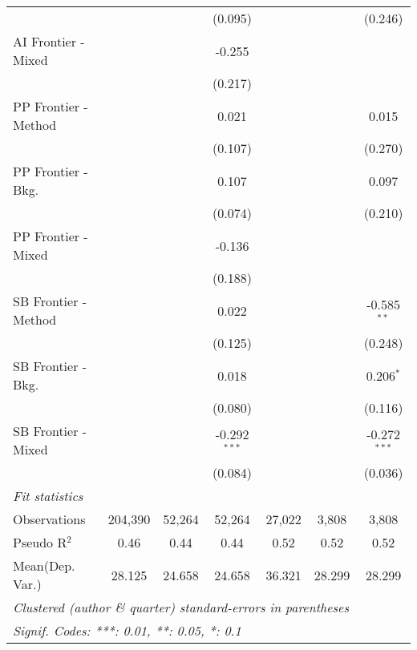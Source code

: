 \begin{tabular}{lcccccc}
                        &               &         & (0.095)        &             &         & (0.246)\\   
   AI Frontier - Mixed  &               &         & -0.255         &             &         &   \\   
                        &               &         & (0.217)        &             &         &   \\   
   PP Frontier - Method &               &         & 0.021          &             &         & 0.015\\   
                        &               &         & (0.107)        &             &         & (0.270)\\   
   PP Frontier - Bkg.   &               &         & 0.107          &             &         & 0.097\\   
                        &               &         & (0.074)        &             &         & (0.210)\\   
   PP Frontier - Mixed  &               &         & -0.136         &             &         &   \\   
                        &               &         & (0.188)        &             &         &   \\   
   SB Frontier - Method &               &         & 0.022          &             &         & -0.585$^{**}$\\   
                        &               &         & (0.125)        &             &         & (0.248)\\   
   SB Frontier - Bkg.   &               &         & 0.018          &             &         & 0.206$^{*}$\\   
                        &               &         & (0.080)        &             &         & (0.116)\\   
   SB Frontier - Mixed  &               &         & -0.292$^{***}$ &             &         & -0.272$^{***}$\\   
                        &               &         & (0.084)        &             &         & (0.036)\\   
   \midrule
   \emph{Fit statistics}\\
   Observations         & 204,390       & 52,264  & 52,264         & 27,022      & 3,808   & 3,808\\  
   Pseudo R$^2$         & 0.46          & 0.44    & 0.44           & 0.52        & 0.52    & 0.52\\  
Mean(Dep. Var.) & 28.125 & 24.658 & 24.658 & 36.321 & 28.299 & 28.299 \\
   \midrule \midrule
   \multicolumn{7}{l}{\emph{Clustered (author \& quarter) standard-errors in parentheses}}\\
   \multicolumn{7}{l}{\emph{Signif. Codes: ***: 0.01, **: 0.05, *: 0.1}}\\
\end{tabular}
\par\endgroup
